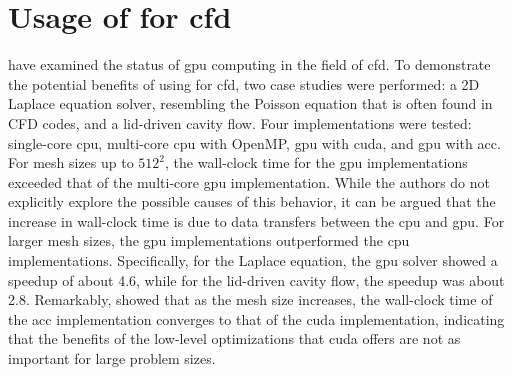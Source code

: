 \section{Usage of  for \acrfull{cfd}}
\citet{niemeyerRecentProgressChallenges2014} have examined the status of \acrshort{gpu} computing in the field of \acrshort{cfd}. To demonstrate the potential benefits of using  for \acrshort{cfd}, two case studies were performed: a 2D Laplace equation solver, resembling the Poisson equation that is often found in CFD codes, and a lid-driven cavity flow. Four implementations were tested: single-core \acrshort{cpu}, multi-core \acrshort{cpu} with OpenMP, \acrshort{gpu} with \acrshort{cuda}, and \acrshort{gpu} with \acrshort{acc}. For mesh sizes up to $512^2$, the wall-clock time for the \acrshort{gpu} implementations exceeded that of the multi-core \acrshort{gpu} implementation. While the authors do not explicitly explore the possible causes of this behavior, it can be argued that the increase in wall-clock time is due to data transfers between the \acrshort{cpu} and \acrshort{gpu}. For larger mesh sizes, the \acrshort{gpu} implementations outperformed the \acrshort{cpu} implementations. Specifically, for the Laplace equation, the \acrshort{gpu} solver showed a speedup of about 4.6, while for the lid-driven cavity flow, the speedup was about 2.8. Remarkably, \citet{niemeyerRecentProgressChallenges2014} showed that as the mesh size increases, the wall-clock time of the \acrshort{acc} implementation converges to that of the \acrshort{cuda} implementation, indicating that the benefits of the low-level optimizations that \acrshort{cuda} offers are not as important for large problem sizes.

